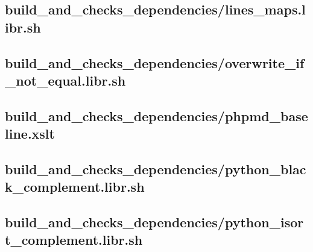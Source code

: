 \documentclass{article}
\begin{document}


\subsection{
  build\_and\_checks\_dependencies/lines\_maps.libr.sh
}
\label{
  build_and_checks_dependencies:lines_mapslibrsh
}



\subsection{
  build\_and\_checks\_dependencies/overwrite\_if\_not\_equal.libr.sh
}
\label{
  build_and_checks_dependencies:overwrite_if_not_equallibrsh
}



\subsection{
  build\_and\_checks\_dependencies/phpmd\_baseline.xslt
}
\label{
  build_and_checks_dependencies:phpmd_baselinexslt
}



\subsection{
  build\_and\_checks\_dependencies/python\_black\_complement.libr.sh
}
\label{
  build_and_checks_dependencies:python_black_complementlibrsh
}



\subsection{
  build\_and\_checks\_dependencies/python\_isort\_complement.libr.sh
}
\label{
  build_and_checks_dependencies:python_isort_complementlibrsh
}

\end{document}
